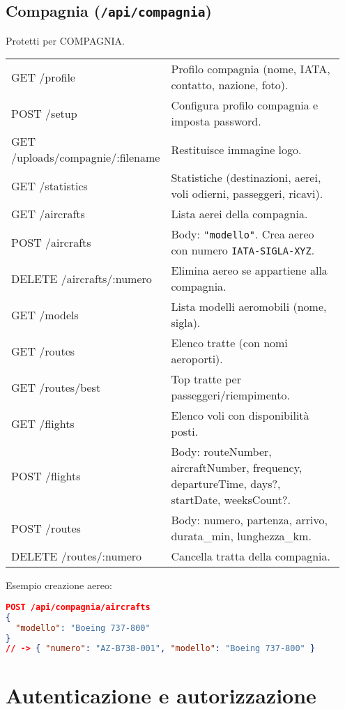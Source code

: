 \documentclass[11pt,a4paper]{article}
\begin{document}
\subsection{Compagnia (\texttt{/api/compagnia})}
Protetti per COMPAGNIA.
\begin{longtable}{p{0.22\linewidth}p{0.73\linewidth}}
GET /profile & Profilo compagnia (nome, IATA, contatto, nazione, foto). \\
POST /setup & Configura profilo compagnia e imposta password. \\
GET /uploads/compagnie/:filename & Restituisce immagine logo. \\
GET /statistics & Statistiche (destinazioni, aerei, voli odierni, passeggeri, ricavi). \\
GET /aircrafts & Lista aerei della compagnia. \\
POST /aircrafts & Body: \texttt{"modello"}. Crea aereo con numero \texttt{IATA-SIGLA-XYZ}. \\
DELETE /aircrafts/:numero & Elimina aereo se appartiene alla compagnia. \\
GET /models & Lista modelli aeromobili (nome, sigla). \\
GET /routes & Elenco tratte (con nomi aeroporti). \\
GET /routes/best & Top tratte per passeggeri/riempimento. \\
GET /flights & Elenco voli con disponibilità posti. \\
POST /flights & Body: {routeNumber, aircraftNumber, frequency, departureTime, days?, startDate, weeksCount?}. \\
POST /routes & Body: {numero, partenza, arrivo, durata\_min, lunghezza\_km}. \\
DELETE /routes/:numero & Cancella tratta della compagnia. \\
\end{longtable}

Esempio creazione aereo:
\begin{lstlisting}[language=JSON]
POST /api/compagnia/aircrafts
{
  "modello": "Boeing 737-800"
}
// -> { "numero": "AZ-B738-001", "modello": "Boeing 737-800" }
\end{lstlisting}

\section{Autenticazione e autorizzazione}
\end{document}
